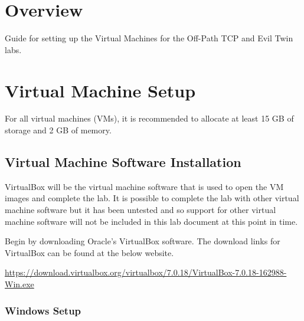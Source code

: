 \documentclass[letterpaper,12pt]{report}
\begin{document}
\clearpage
{}
\settableofcontents
\tableofcontents
\clearpage

\newpage
\section*{Overview}\label{sec:work-carried-out}

Guide for setting up the Virtual Machines for the Off-Path TCP and Evil Twin labs.


\section*{Virtual Machine Setup}\label{sec:Virtual-Machine-Setup}

For all virtual machines (VMs), it is recommended to allocate at least 15 GB of storage and 2 GB of memory.

\subsection*{Virtual Machine Software Installation}\label{sec:Virtual-Machine-Software-Installation}

VirtualBox will be the virtual machine software that is used to open the VM images and complete the lab. It is possible to complete the lab with other virtual machine software but it has been untested and so support for other virtual machine software will not be included in this lab document at this point in time.

Begin by downloading Oracle's VirtualBox software. The download links for VirtualBox can be found at the below website.

\url{https://download.virtualbox.org/virtualbox/7.0.18/VirtualBox-7.0.18-162988-Win.exe}

\subsubsection*{Windows Setup}\label{sec:Virtual-Machine-Windows-Setup}
\end{document}
